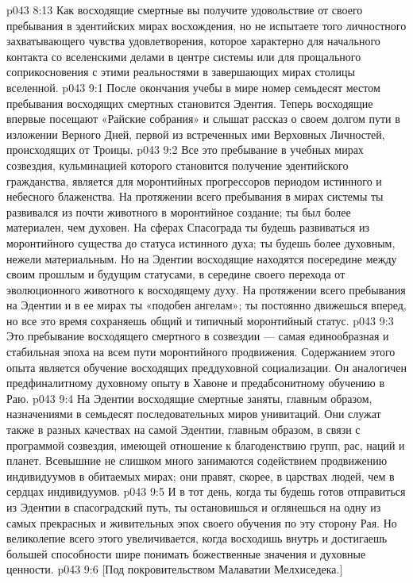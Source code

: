 \vs p043 8:13 Как восходящие смертные вы получите удовольствие от своего пребывания в эдентийских мирах восхождения, но не испытаете того личностного захватывающего чувства удовлетворения, которое характерно для начального контакта со вселенскими делами в центре системы или для прощального соприкосновения с этими реальностями в завершающих мирах столицы вселенной.
\vs p043 9:1 После окончания учебы в мире номер семьдесят местом пребывания восходящих смертных становится Эдентия. Теперь восходящие впервые посещают «Райские собрания» и слышат рассказ о своем долгом пути в изложении Верного Дней, первой из встреченных ими Верховных Личностей, происходящих от Троицы.
\vs p043 9:2 \pc Все это пребывание в учебных мирах созвездия, кульминацией которого становится получение эдентийского гражданства, является для моронтийных прогрессоров периодом истинного и небесного блаженства. На протяжении всего пребывания в мирах системы ты развивался из почти животного в моронтийное создание; ты был более материален, чем духовен. На сферах Спасограда ты будешь развиваться из моронтийного существа до статуса истинного духа; ты будешь более духовным, нежели материальным. Но на Эдентии восходящие находятся посередине между своим прошлым и будущим статусами, в середине своего перехода от эволюционного животного к восходящему духу. На протяжении всего пребывания на Эдентии и в ее мирах ты «подобен ангелам»; ты постоянно движешься вперед, но все это время сохраняешь общий и типичный моронтийный статус.
\vs p043 9:3 Это пребывание восходящего смертного в созвездии --- самая единообразная и стабильная эпоха на всем пути моронтийного продвижения. Содержанием этого опыта является обучение восходящих преддуховной социализации. Он аналогичен предфиналитному духовному опыту в Хавоне и предабсонитному обучению в Раю.
\vs p043 9:4 \pc На Эдентии восходящие смертные заняты, главным образом, назначениями в семьдесят последовательных миров унивитаций. Они служат также в разных качествах на самой Эдентии, главным образом, в связи с программой созвездия, имеющей отношение к благоденствию групп, рас, наций и планет. Всевышние не слишком много занимаются содействием продвижению индивидуумов в обитаемых мирах; они правят, скорее, в царствах людей, чем в сердцах индивидуумов.
\vs p043 9:5 И в тот день, когда ты будешь готов отправиться из Эдентии в спасоградский путь, ты остановишься и оглянешься на одну из самых прекрасных и живительных эпох своего обучения по эту сторону Рая. Но великолепие всего этого увеличивается, когда восходишь внутрь и достигаешь большей способности шире понимать божественные значения и духовные ценности.
\vsetoff
\vs p043 9:6 [Под покровительством Малаватии Мелхиседека.]
